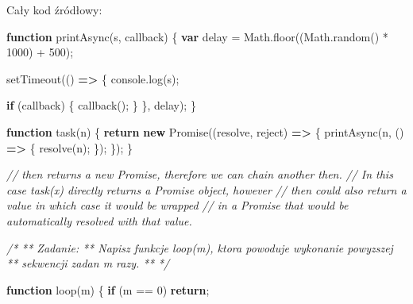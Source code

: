 \documentclass[11pt]{article}
\newenvironment{Shaded}{}{}
\newcommand{\KeywordTok}[1]{\textcolor[rgb]{0.00,0.44,0.13}{\textbf{{#1}}}}
\newcommand{\DecValTok}[1]{\textcolor[rgb]{0.25,0.63,0.44}{{#1}}}
\newcommand{\CommentTok}[1]{\textcolor[rgb]{0.38,0.63,0.69}{\textit{{#1}}}}
\newcommand{\FunctionTok}[1]{\textcolor[rgb]{0.02,0.16,0.49}{{#1}}}
\newcommand{\NormalTok}[1]{{#1}}
\newcommand{\ControlFlowTok}[1]{\textcolor[rgb]{0.00,0.44,0.13}{\textbf{{#1}}}}
\newcommand{\OperatorTok}[1]{\textcolor[rgb]{0.40,0.40,0.40}{{#1}}}
\newcommand{\BuiltInTok}[1]{{#1}}
\newcommand{\PreprocessorTok}[1]{\textcolor[rgb]{0.74,0.48,0.00}{{#1}}}
\begin{document}
Cały kod źródłowy:

\begin{Shaded}
\begin{Highlighting}[]
\KeywordTok{function} \FunctionTok{printAsync}\NormalTok{(s}\OperatorTok{,}\NormalTok{ callback) \{}
    \KeywordTok{var}\NormalTok{ delay }\OperatorTok{=} \BuiltInTok{Math}\OperatorTok{.}\FunctionTok{floor}\NormalTok{((}\BuiltInTok{Math}\OperatorTok{.}\FunctionTok{random}\NormalTok{() }\OperatorTok{*} \DecValTok{1000}\NormalTok{) }\OperatorTok{+} \DecValTok{500}\NormalTok{)}\OperatorTok{;}

    \PreprocessorTok{setTimeout}\NormalTok{(() }\KeywordTok{=\textgreater{}}\NormalTok{ \{}
        \BuiltInTok{console}\OperatorTok{.}\FunctionTok{log}\NormalTok{(s)}\OperatorTok{;}

        \ControlFlowTok{if}\NormalTok{ (callback) \{}
            \FunctionTok{callback}\NormalTok{()}\OperatorTok{;}
\NormalTok{        \}}
\NormalTok{    \}}\OperatorTok{,}\NormalTok{ delay)}\OperatorTok{;}
\NormalTok{\}}

\KeywordTok{function} \FunctionTok{task}\NormalTok{(n) \{}
    \ControlFlowTok{return} \KeywordTok{new} \BuiltInTok{Promise}\NormalTok{((resolve}\OperatorTok{,}\NormalTok{ reject) }\KeywordTok{=\textgreater{}}\NormalTok{ \{}
        \FunctionTok{printAsync}\NormalTok{(n}\OperatorTok{,}\NormalTok{ () }\KeywordTok{=\textgreater{}}\NormalTok{ \{}
            \FunctionTok{resolve}\NormalTok{(n)}\OperatorTok{;}
\NormalTok{        \})}\OperatorTok{;}
\NormalTok{    \})}\OperatorTok{;}
\NormalTok{\}}


\CommentTok{// \textquotesingle{}then\textquotesingle{} returns a new Promise, therefore we can chain another \textquotesingle{}then\textquotesingle{}.}
\CommentTok{// In this case \textquotesingle{}task(x)\textquotesingle{} directly returns a Promise object, however}
\CommentTok{// \textquotesingle{}then\textquotesingle{} could also return a value in which case it would be wrapped}
\CommentTok{// in a Promise that would be automatically resolved with that value.}

\CommentTok{/*}
\CommentTok{** Zadanie:}
\CommentTok{** Napisz funkcje loop(m), ktora powoduje wykonanie powyzszej}
\CommentTok{** sekwencji zadan m razy.}
\CommentTok{**}
\CommentTok{*/}

\KeywordTok{function} \FunctionTok{loop}\NormalTok{(m) \{}
    \ControlFlowTok{if}\NormalTok{ (m }\OperatorTok{==} \DecValTok{0}\NormalTok{)}
        \ControlFlowTok{return}\OperatorTok{;}


\end{Highlighting}
\end{Shaded}
\end{document}
